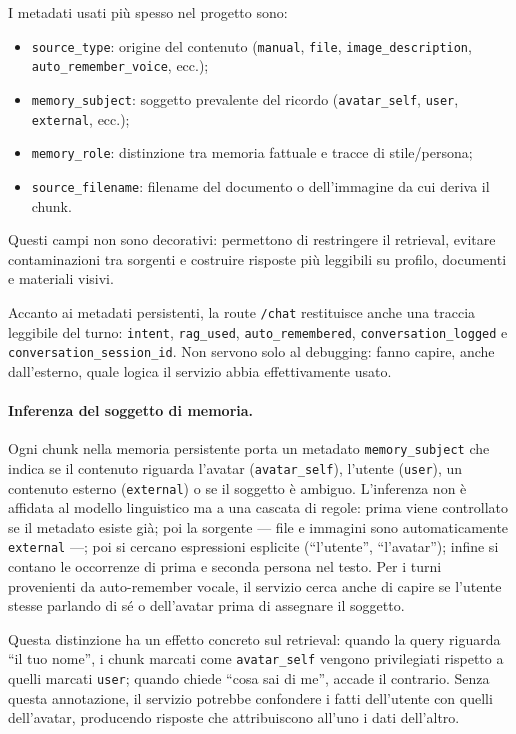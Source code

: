 I metadati usati più spesso nel progetto sono:
\begin{itemize}
\item \texttt{source\_type}: origine del contenuto (\texttt{manual}, \texttt{file}, \texttt{image\_description}, \texttt{auto\_remember\_voice}, ecc.);
\item \texttt{memory\_subject}: soggetto prevalente del ricordo (\texttt{avatar\_self}, \texttt{user}, \texttt{external}, ecc.);
\item \texttt{memory\_role}: distinzione tra memoria fattuale e tracce di stile/persona;
\item \texttt{source\_filename}: filename del documento o dell'immagine da cui deriva il chunk.
\end{itemize}

Questi campi non sono decorativi: permettono di restringere il retrieval, evitare contaminazioni tra sorgenti e costruire risposte più leggibili su profilo, documenti e materiali visivi.

Accanto ai metadati persistenti, la route \texttt{/chat} restituisce anche una traccia leggibile del turno: \texttt{intent}, \texttt{rag\_used}, \texttt{auto\_remembered}, \texttt{conversation\_logged} e \texttt{conversation\_session\_id}. Non servono solo al debugging: fanno capire, anche dall'esterno, quale logica il servizio abbia effettivamente usato.

\paragraph{Inferenza del soggetto di memoria.}

Ogni chunk nella memoria persistente porta un metadato \texttt{memory\_subject} che indica se il contenuto riguarda l'avatar (\texttt{avatar\_self}), l'utente (\texttt{user}), un contenuto esterno (\texttt{external}) o se il soggetto è ambiguo. L'inferenza non è affidata al modello linguistico ma a una cascata di regole: prima viene controllato se il metadato esiste già; poi la sorgente --- file e immagini sono automaticamente \texttt{external} ---; poi si cercano espressioni esplicite (``l'utente'', ``l'avatar''); infine si contano le occorrenze di prima e seconda persona nel testo. Per i turni provenienti da auto-remember vocale, il servizio cerca anche di capire se l'utente stesse parlando di sé o dell'avatar prima di assegnare il soggetto.

Questa distinzione ha un effetto concreto sul retrieval: quando la query riguarda ``il tuo nome'', i chunk marcati come \texttt{avatar\_self} vengono privilegiati rispetto a quelli marcati \texttt{user}; quando chiede ``cosa sai di me'', accade il contrario. Senza questa annotazione, il servizio potrebbe confondere i fatti dell'utente con quelli dell'avatar, producendo risposte che attribuiscono all'uno i dati dell'altro.

